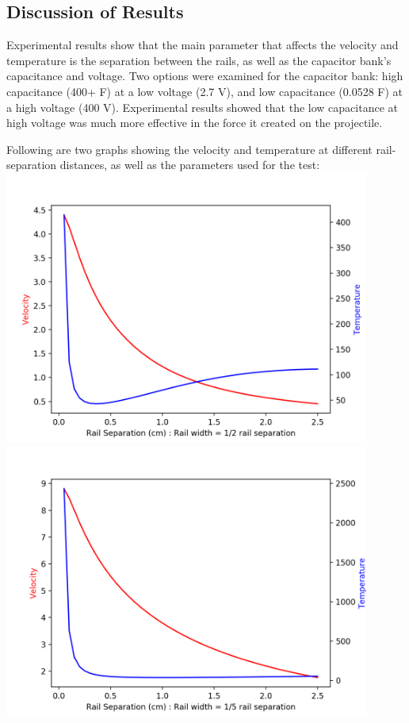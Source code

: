 \documentclass[12pt]{article}
\begin{document}
\subsection{Discussion of Results}
Experimental results show that the main parameter that affects the velocity and temperature is the separation between the rails, as well as the capacitor bank's capacitance and voltage. Two options were examined for the capacitor bank: high capacitance (400+ F) at a low voltage (2.7 V), and low capacitance (0.0528 F) at a high voltage (400 V). Experimental results showed that the low capacitance at high voltage was much more effective in the force it created on the projectile. 

Following are two graphs showing the velocity and temperature at different rail-separation distances, as well as the parameters used for the test: \\
\includegraphics[width=12cm]{fig1} \\
\includegraphics[width=12cm]{fig2} \\ \\
\end{document}
